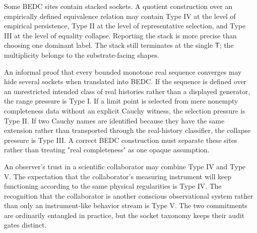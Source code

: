 \begin{remark}
\label{rem:transcendental-supply-stacked-sockets}
Some BEDC sites contain stacked sockets. A quotient construction over an empirically defined equivalence relation may contain Type IV at the level of empirical persistence, Type II at the level of representative selection, and Type III at the level of equality collapse. Reporting the stack is more precise than choosing one dominant label. The stack still terminates at the single $\mathsf{T}$; the multiplicity belongs to the substrate-facing shapes.
\end{remark}

\begin{example}
\label{ex:transcendental-supply-analysis-stack}
An informal proof that every bounded monotone real sequence converges may hide several sockets when translated into BEDC. If the sequence is defined over an unrestricted intended class of real histories rather than a displayed generator, the range pressure is Type I. If a limit point is selected from mere nonempty completeness data without an explicit Cauchy witness, the selection pressure is Type II. If two Cauchy names are identified because they have the same extension rather than transported through the real-history classifier, the collapse pressure is Type III. A correct BEDC construction must separate these sites rather than treating "real completeness" as one opaque assumption.
\end{example}

\begin{example}
\label{ex:transcendental-supply-observer-stack}
An observer's trust in a scientific collaborator may combine Type IV and Type V. The expectation that the collaborator's measuring instrument will keep functioning according to the same physical regularities is Type IV. The recognition that the collaborator is another conscious observational system rather than only an instrument-like behavior stream is Type V. The two commitments are ordinarily entangled in practice, but the socket taxonomy keeps their audit gates distinct.
\end{example}


